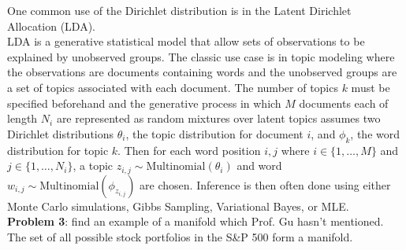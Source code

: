 \documentclass[12pt,letterpaper,cm]{hmcpset}
\begin{document}
One common use of the Dirichlet distribution is in the Latent Dirichlet Allocation (LDA). \\
LDA is a generative statistical model that allow sets of observations to be explained by unobserved groups. The classic use case is in topic modeling where the observations are documents containing words and the unobserved groups are a set of topics associated with each document. The number of topics $k$ must be specified beforehand and the generative process in which $M$ documents each of length $N_i$ are represented as random mixtures over latent topics assumes two Dirichlet distributions $\theta_i$, the topic distribution for document $i$, and $\phi_k$, the word distribution for topic $k$. Then for each word position $i, j$ where $i \in \{1, \ldots, M\}$ and $j \in \{1, \ldots, N_i\}$, a topic $z_{i, j} \sim \text{Multinomial}(\theta_i)$ and word $w_{i, j} \sim \text{Multinomial}(\phi_{z_{i, j}})$ are chosen. Inference is then often done using either Monte Carlo simulations, Gibbs Sampling, Variational Bayes, or MLE. \\

\textbf{Problem 3}: find an example of a manifold which Prof. Gu hasn't mentioned. \\
The set of all possible stock portfolios in the S\&P 500 form a manifold. 
\end{document}
